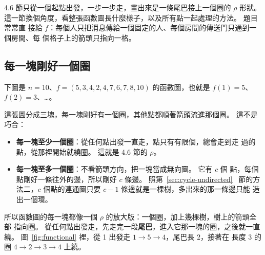 4.6 節只從一個起點出發，一步一步走，畫出來是一條尾巴接上一個圈的 $\rho$ 形狀。
這一節換個角度，看整張函數圖長什麼樣子，以及所有點一起處理的方法。 題目常常直
接給 $f$：每個人只把消息傳給一個固定的人、每個房間的傳送門只通到一個房間、每
個格子上的箭頭只指向一格。

\subsection{每一塊剛好一個圈}

下圖是 $n = 10$、$f = (5, 3, 4, 2, 4, 7, 6, 7, 8, 10)$ 的函數圖，也就是
$f(1) = 5$、$f(2) = 3$、\ldots。

\begin{center}
\label{fig:functional}
\end{center}

這張圖分成三塊，每一塊剛好有一個圈，其他點都順著箭頭流進那個圈。 這不是巧合：

\begin{itemize}
\item \textbf{每一塊至少一個圈}：從任何點出發一直走，點只有有限個，總會走到走
過的點，從那裡開始就繞圈。 這就是 4.6 節的 $\rho$。
\item \textbf{每一塊至多一個圈}：不看箭頭方向，把一塊當成無向圖。 它有 $c$ 個
點，每個點剛好一條往外的邊，所以剛好 $c$ 條邊。 照第~\ref{sec:cycle-undirected}~
節的方法二，$c$ 個點的連通圖只要 $c - 1$ 條邊就是一棵樹，多出來的那一條邊只能
造出一個環。
\end{itemize}

所以函數圖的每一塊都像一個 $\rho$ 的放大版：一個圈，加上幾棵樹，樹上的箭頭全部
指向圈。 從任何點出發走，先走完一段\textbf{尾巴}，進入它那一塊的圈，之後就一直
繞。 圖~\ref{fig:functional} 裡，從 1 出發走 $1 \to 5 \to 4$，尾巴長 $2$，接著在
長度 $3$ 的圈 $4 \to 2 \to 3 \to 4$ 上繞。

